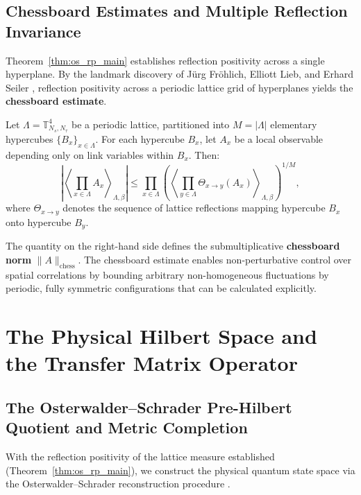\subsection{Chessboard Estimates and Multiple Reflection Invariance}
\label{subsec:chessboard_estimates_intro}
Theorem~\ref{thm:os_rp_main} establishes reflection positivity across a single hyperplane. By the landmark discovery of J\"urg Fr\"ohlich, Elliott Lieb, and Erhard Seiler \cite{FrohlichLiebSeiler1976}, reflection positivity across a periodic lattice grid of hyperplanes yields the \textbf{chessboard estimate}.
\begin{theorem}
\label{thm:chessboard_estimate_intro}
Let $\Lambda = \mathbb{T}_{N_s, N_\tau}^4$ be a periodic lattice, partitioned into $M = |\Lambda|$ elementary hypercubes $\{B_x\}_{x \in \Lambda}$. For each hypercube $B_x$, let $A_x$ be a local observable depending only on link variables within $B_x$. Then:
\begin{equation}
\label{eq:chessboard_inequality_intro}
\left| \left\langle \prod_{x \in \Lambda} A_x \right\rangle_{\Lambda, \beta} \right| \le \prod_{x \in \Lambda} \left( \left\langle \prod_{y \in \Lambda} \Theta_{x \to y}(A_x) \right\rangle_{\Lambda, \beta} \right)^{1/M},
\end{equation}
where $\Theta_{x \to y}$ denotes the sequence of lattice reflections mapping hypercube $B_x$ onto hypercube $B_y$.
\end{theorem}
The quantity on the right-hand side defines the submultiplicative \textbf{chessboard norm} $\|A\|_{\mathrm{chess}}$. The chessboard estimate enables non-perturbative control over spatial correlations by bounding arbitrary non-homogeneous fluctuations by periodic, fully symmetric configurations that can be calculated explicitly.


\section{The Physical Hilbert Space and the Transfer Matrix Operator}
\label{sec:hilbert_transfer}

\subsection{The Osterwalder--Schrader Pre-Hilbert Quotient and Metric Completion}
\label{subsec:os_hilbert_quotient}
With the reflection positivity of the lattice measure established (Theorem~\ref{thm:os_rp_main}), we construct the physical quantum state space via the Osterwalder--Schrader reconstruction procedure \cite{OsterwalderSchrader1973, OsterwalderSeiler1978}.

